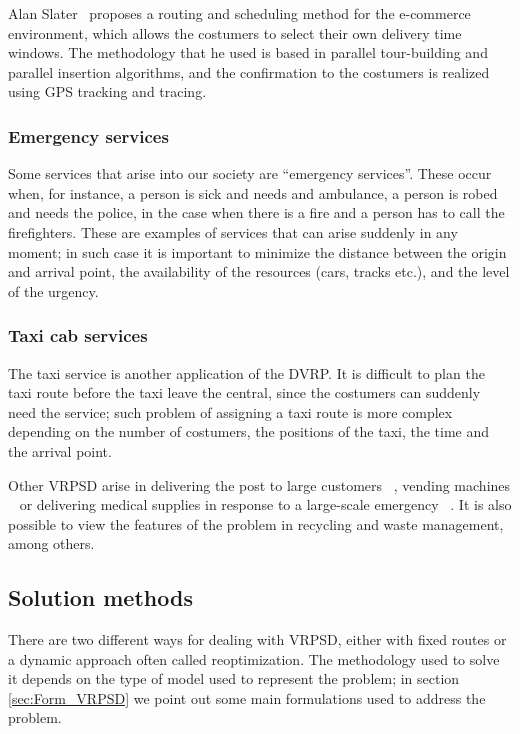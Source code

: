Alan Slater~\cite{slater_specification_2002} proposes a routing and scheduling method for the e-commerce environment, which allows the costumers to select their own delivery time windows. The methodology that he used is based in parallel tour-building and parallel insertion algorithms, and the confirmation to the costumers is realized using GPS tracking and tracing.

\subsubsection*{Emergency services}

Some services that arise into our society are ``emergency services''. These occur when, for instance, a person is sick and needs and ambulance, a person is robed and needs the police, in the case when there is a fire and a person has to call the firefighters. These are examples of services that can arise suddenly in any moment; in such case it is important to minimize the distance between the origin and arrival point, the availability of the resources (cars, tracks etc.), and the level of the urgency. 

\subsubsection*{Taxi cab services}

The taxi service is another application of the DVRP. It is difficult to plan the taxi route before the taxi leave the central, since the costumers can  suddenly need the service; such problem of assigning a taxi route is more complex depending on the number of costumers, the positions of the taxi, the time and the arrival point.

Other VRPSD arise in delivering the post to large customers ~\cite{Markovic_2005}, vending machines ~\cite{yang_stochastic_2000} or delivering medical supplies in response to a large-scale emergency ~\cite{dessouky_rapid_2006}. It is also possible to view the features of the problem in recycling and waste management, among others.

\subsection{Solution methods}

There are two different ways for dealing with VRPSD, either with fixed routes or a dynamic approach often called reoptimization. The methodology used to solve it depends on the type of model used to represent the problem; in section \ref{sec:Form_VRPSD} we point out some main formulations used to address the problem. 


